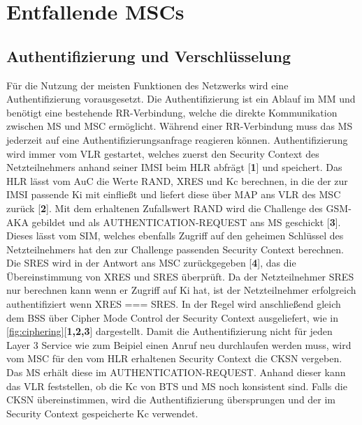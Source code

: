 \chapter{Entfallende MSCs}

\section{Authentifizierung und Verschlüsselung} \label{hdl:grundlagen_aka}



Für die Nutzung der meisten Funktionen des Netzwerks wird eine Authentifizierung vorausgesetzt. Die Authentifizierung ist ein Ablauf im \ac{MM} und benötigt eine bestehende \ac{RR}-Verbindung, welche die direkte Kommunikation zwischen \ac{MS} und \ac{MSC} ermöglicht. Während einer \ac{RR}-Verbindung muss das \ac{MS} jederzeit  auf eine Authentifizierungsanfrage reagieren können. Authentifizierung wird immer vom \ac{VLR} gestartet, welches zuerst den Security Context des Netzteilnehmers anhand seiner \ac{IMSI} beim \ac{HLR} abfrägt [\textbf{1}] und speichert. Das \ac{HLR} lässt vom \ac{AuC} die Werte \ac{RAND}, \ac{XRES} und \ac{Kc} berechnen, in die der zur \ac{IMSI} passende \ac{Ki} mit einfließt und liefert diese über \ac{MAP} ans \ac{VLR} des \ac{MSC} zurück [\textbf{2}]. Mit dem erhaltenen Zufallswert \ac{RAND} wird die Challenge des \ac{GSM}-\ac{AKA} gebildet und als AUTHENTICATION-REQUEST ans \ac{MS} geschickt [\textbf{3}]. Dieses lässt vom \ac{SIM}, welches ebenfalls Zugriff auf den geheimen Schlüssel des Netzteilnehmers hat den zur Challenge passenden Security Context berechnen. Die \ac{SRES} wird in der Antwort ans \ac{MSC} zurückgegeben [\textbf{4}], das die Übereinstimmung von \ac{XRES} und \ac{SRES} überprüft. Da der Netzteilnehmer \ac{SRES} nur berechnen kann wenn er Zugriff auf \ac{Ki} hat, ist der Netzteilnehmer erfolgreich authentifiziert wenn \ac{XRES} === \ac{SRES}. In der Regel wird anschließend gleich dem \ac{BSS} über Cipher Mode Control  der Security Context ausgeliefert, wie in \autoref{fig:ciphering}[\textbf{1,2,3}] dargestellt. Damit die Authentifizierung nicht für jeden Layer 3 Service wie zum Beipiel einen Anruf neu durchlaufen werden muss, wird vom \ac{MSC} für den vom HLR erhaltenen Security Context die \ac{CKSN} vergeben. Das \ac{MS} erhält diese im AUTHENTICATION-REQUEST.  Anhand dieser kann das \ac{VLR} feststellen, ob die \ac{Kc} von \ac{BTS} und \ac{MS} noch konsistent sind. Falls die \ac{CKSN} übereinstimmen, wird die Authentifizierung übersprungen und der im Security Context gespeicherte \ac{Kc} verwendet. 

